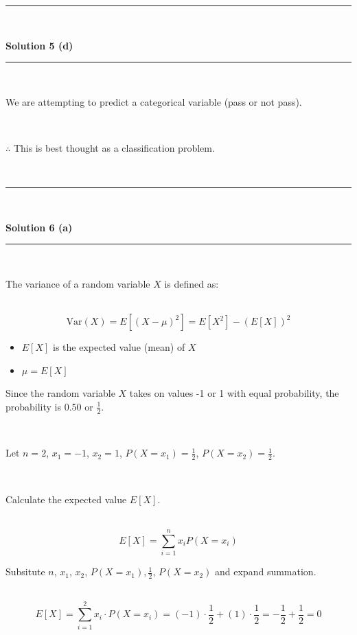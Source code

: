 \documentclass{article}
\begin{document}
\noindent\rule{\textwidth}{0.4pt}\\

\newpage

\textbf{Solution 5 (d)}

\noindent\rule{\textwidth}{0.4pt}\\

\parbox{\textwidth}{We are attempting to predict a categorical variable (pass or not pass).}\\

\parbox{\textwidth}{$\therefore$ This is best thought as a classification problem.}\\

\noindent\rule{\textwidth}{0.4pt}\\

\newpage

\textbf{Solution 6 (a)}

\noindent\rule{\textwidth}{0.4pt}\\

\parbox{\textwidth}{The variance of a random variable $X$ is defined as:}\\

$$\text{Var}(X) = E[(X - \mu)^2] = E[X^2] - (E[X])^2$$

\begin{itemize}
    \item $E[X]$ is the expected value (mean) of $X$
    \item $\mu = E[X]$
\end{itemize}

\parbox{\textwidth}{Since the random variable $X$ takes on values -1 or 1 with equal probability, the probability is $0.50$ or $\frac{1}{2}$.}\\

\parbox{\textwidth}{Let $n = 2$, $x_1 = -1$, $x_2 = 1$, $P(X = x_1) = \frac{1}{2}$, $P(X = x_2) = \frac{1}{2}$.}\\

\parbox{\textwidth}{Calculate the expected value $E[X]$.}\\

$$E[X] = \sum^{n}_{i=1} x_i P(X = x_i)$$

\parbox{\textwidth}{Subsitute $n$, $x_1$, $x_2$, $P(X = x_1), \frac{1}{2}$, $P(X = x_2)$ and expand summation.}\\

$$E[X] = \sum^2_{i=1} x_i \cdot P(X = x_i) = (-1) \cdot \frac{1}{2} + (1) \cdot \frac{1}{2} = -\frac{1}{2} + \frac{1}{2} = 0$$\\
\end{document}
